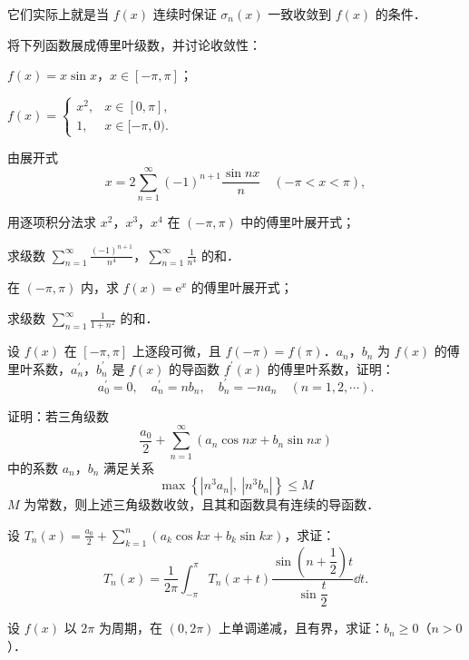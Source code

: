 它们实际上就是当 $f(x)$ 连续时保证 $\sigma_{n}(x)$ 一致收敛到 $f(x)$ 的条件．

\begin{xiti}
\item 将下列函数展成傅里叶级数，并讨论收敛性：
\begin{ziti}
\item $f(x)=x\sin x$，$x\in[-\pi,\pi]$；
\item $f(x)=\begin{cases}x^{2},&x\in[0,\pi],\\ 1,&x\in[-\pi,0).\end{cases}$
\end{ziti}
\item 由展开式
\[
x=2\sum_{n=1}^{\infty}(-1)^{n+1}\frac{\sin nx}{n}\quad(-\pi<x<\pi),
\]
\begin{ziti}
\item 用逐项积分法求 $x^{2}$，$x^{3}$，$x^{4}$ 在 $(-\pi,\pi)$ 中的傅里叶展开式；
\item 求级数 $\displaystyle\sum_{n=1}^{\infty}\frac{(-1)^{n+1}}{n^{4}}$，$\displaystyle\sum_{n=1}^{\infty}\frac{1}{n^{4}}$ 的和．
\end{ziti}
\item
\begin{ziti}
\item 在 $(-\pi,\pi)$ 内，求 $f(x)=\mathrm{e}^{x}$ 的傅里叶展开式；
\item 求级数 $\displaystyle\sum_{n=1}^{\infty}\frac{1}{1+n^{2}}$ 的和．
\end{ziti}
\item 设 $f(x)$ 在 $[-\pi,\pi]$ 上逐段可微，且 $f(-\pi)=f(\pi)$．$a_{n}$，$b_{n}$ 为 $f(x)$ 的傅里叶系数，$a_{n}^{\prime}$，$b_{n}^{\prime}$ 是 $f(x)$ 的导函数 $f^{\prime}(x)$ 的傅里叶系数，证明：
\[
a_{0}^{\prime}=0,\quad a_{n}^{\prime}=nb_{n},\quad b_{n}^{\prime}=-na_{n}\quad(n=1,2,\cdots).
\]
\item 证明：若三角级数
\[
\frac{a_{0}}{2}+\sum_{n=1}^{\infty}\left(a_{n}\cos nx+b_{n}\sin nx\right)
\]
中的系数 $a_{n}$，$b_{n}$ 满足关系
\[
\max\left\{\left|n^{3}a_{n}\right|,\ \left|n^{3}b_{n}\right|\right\}\leqslant M
\]
$M$ 为常数，则上述三角级数收敛，且其和函数具有连续的导函数．
\item 设 $\displaystyle T_{n}(x)=\frac{a_{0}}{2}+\sum_{k=1}^{n}\left(a_{k}\cos kx+b_{k}\sin kx\right)$，求证：
\[
T_{n}(x)=\frac{1}{2\pi}\int_{-\pi}^{\pi}T_{n}(x+t)\frac{\sin\left(n+\dfrac{1}{2}\right)t}{\sin\dfrac{t}{2}}\dd t.
\]
\item 设 $f(x)$ 以 $2\pi$ 为周期，在 $(0,2\pi)$ 上单调递减，且有界，求证：$b_{n}\geqslant 0$（$n>0$）．

\end{xiti}
